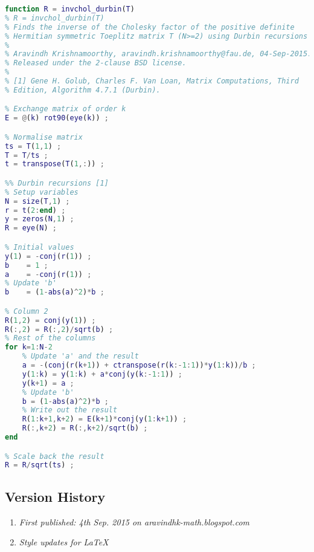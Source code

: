 \begin{lstlisting}[language=MATLAB,numbers=none]
function R = invchol_durbin(T)
% R = invchol_durbin(T)
% Finds the inverse of the Cholesky factor of the positive definite
% Hermitian symmetric Toeplitz matrix T (N>=2) using Durbin recursions [1].
%
% Aravindh Krishnamoorthy, aravindh.krishnamoorthy@fau.de, 04-Sep-2015.
% Released under the 2-clause BSD license.
%
% [1] Gene H. Golub, Charles F. Van Loan, Matrix Computations, Third
% Edition, Algorithm 4.7.1 (Durbin).

% Exchange matrix of order k
E = @(k) rot90(eye(k)) ;

% Normalise matrix
ts = T(1,1) ;
T = T/ts ;
t = transpose(T(1,:)) ;

%% Durbin recursions [1]
% Setup variables
N = size(T,1) ;
r = t(2:end) ;
y = zeros(N,1) ;
R = eye(N) ;

% Initial values
y(1) = -conj(r(1)) ;
b    = 1 ;
a    = -conj(r(1)) ;
% Update 'b'
b    = (1-abs(a)^2)*b ;

% Column 2
R(1,2) = conj(y(1)) ;
R(:,2) = R(:,2)/sqrt(b) ;
% Rest of the columns
for k=1:N-2
	% Update 'a' and the result
	a = -(conj(r(k+1)) + ctranspose(r(k:-1:1))*y(1:k))/b ;
	y(1:k) = y(1:k) + a*conj(y(k:-1:1)) ;
	y(k+1) = a ;
	% Update 'b'
	b = (1-abs(a)^2)*b ;
	% Write out the result
	R(1:k+1,k+2) = E(k+1)*conj(y(1:k+1)) ;
	R(:,k+2) = R(:,k+2)/sqrt(b) ;
end

% Scale back the result
R = R/sqrt(ts) ;
\end{lstlisting}

\subsection{Version History}
\begin{enumerate}
	\item \emph{First published: 4th Sep. 2015 on aravindhk-math.blogspot.com}
	\item \emph{Style updates for \LaTeX}
\end{enumerate}
